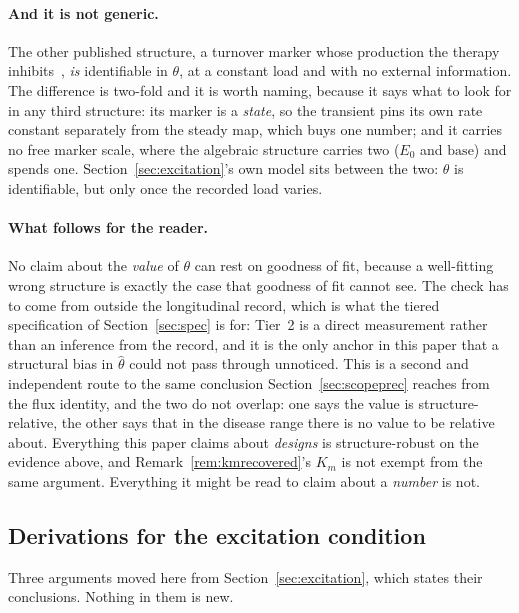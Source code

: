 \begin{remark}
\paragraph{And it is not generic.} The other published structure, a turnover marker whose
production the therapy inhibits~\cite{dose_selection_poster,mrna_moa}, \emph{is}
identifiable in $\theta$, at a constant load and with no external information. The
difference is two-fold and it is worth naming, because it says what to look for in any
third structure: its marker is a \emph{state}, so the transient pins its own rate constant
separately from the steady map, which buys one number; and it carries no free marker
scale, where the algebraic structure carries two ($E_0$ and $\mathrm{base}$) and spends
one. Section~\ref{sec:excitation}'s own model sits between the two: $\theta$ is
identifiable, but only once the recorded load varies.

\paragraph{What follows for the reader.} No claim about the \emph{value} of $\theta$ can
rest on goodness of fit, because a well-fitting wrong structure is exactly the case that
goodness of fit cannot see. The check has to come from outside the longitudinal record,
which is what the tiered specification of Section~\ref{sec:spec} is for: Tier~2 is a direct
measurement rather than an inference from the record, and it is the only anchor in this
paper that a structural bias in $\hat\theta$ could not pass through unnoticed. This is a
second and independent route to the same conclusion Section~\ref{sec:scopeprec} reaches
from the flux identity, and the two do not overlap: one says the value is structure-
relative, the other says that in the disease range there is no value to be relative about.
Everything this paper claims about \emph{designs} is structure-robust on the evidence
above, and Remark~\ref{rem:kmrecovered}'s $K_m$ is not exempt from the same argument.
Everything it might be read to claim about a \emph{number} is not.
\end{remark}

\subsection{Derivations for the excitation condition}
\label{sec:excitationproofs}

Three arguments moved here from Section~\ref{sec:excitation}, which states their
conclusions. Nothing in them is new.

